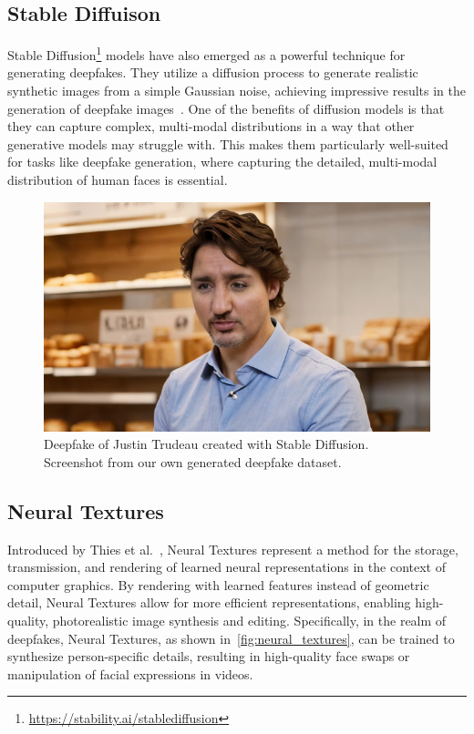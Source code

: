 \subsection{Stable Diffuison}\label{sec:stable-diffusion}
Stable Diffusion\footnote{\url{https://stability.ai/stablediffusion}} models have
also emerged as a powerful technique for generating deepfakes.
They utilize a diffusion process to generate realistic synthetic images from a
simple Gaussian noise, achieving impressive results in the generation of
deepfake images~\cite{wu2022unifying}. One of the benefits of diffusion models
is that they can capture complex, multi-modal distributions in a way that
other generative models may struggle with. This makes them particularly
well-suited for tasks like deepfake generation, where capturing the
detailed, multi-modal distribution of human faces is essential.

\begin{figure}[ht]
	\centering
	\includegraphics[width=0.59\columnwidth]{figures/justion-trudeau-stable-diff}
	\caption{Deepfake of Justin Trudeau created with Stable Diffusion.
		Screenshot from our own generated deepfake dataset.} %
\end{figure}

\subsection{Neural Textures}
Introduced by Thies et al.~\cite{thies2019deferred}, Neural Textures represent
a method for the storage, transmission, and rendering of learned
neural representations in the context of computer graphics.
By rendering with learned features instead of geometric detail, Neural
Textures allow for more efficient representations, enabling high-quality,
photorealistic image synthesis and editing. Specifically, in the realm of
deepfakes, Neural Textures, as shown in~\autoref{fig:neural_textures}, can be trained to synthesize person-specific
details, resulting in high-quality face swaps or manipulation of facial
expressions in videos.

